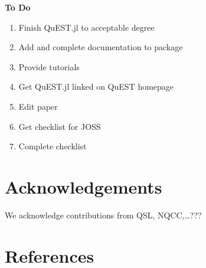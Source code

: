 \documentclass[
]{article}
\providecommand{\tightlist}{%
  \setlength{\itemsep}{0pt}\setlength{\parskip}{0pt}}
\begin{document}
\textbf{To Do}

\begin{enumerate}
\def\labelenumi{\arabic{enumi}.}
\tightlist
\item
  Finish QuEST.jl to acceptable degree
\item
  Add and complete documentation to package
\item
  Provide tutorials
\item
  Get QuEST.jl linked on QuEST homepage
\item
  Edit paper
\item
  Get checklist for JOSS
\item
  Complete checklist
\end{enumerate}

\section{Acknowledgements}\label{acknowledgements}

We acknowledge contributions from QSL, NQCC,\ldots???

\section{References}\label{references}
\end{document}
